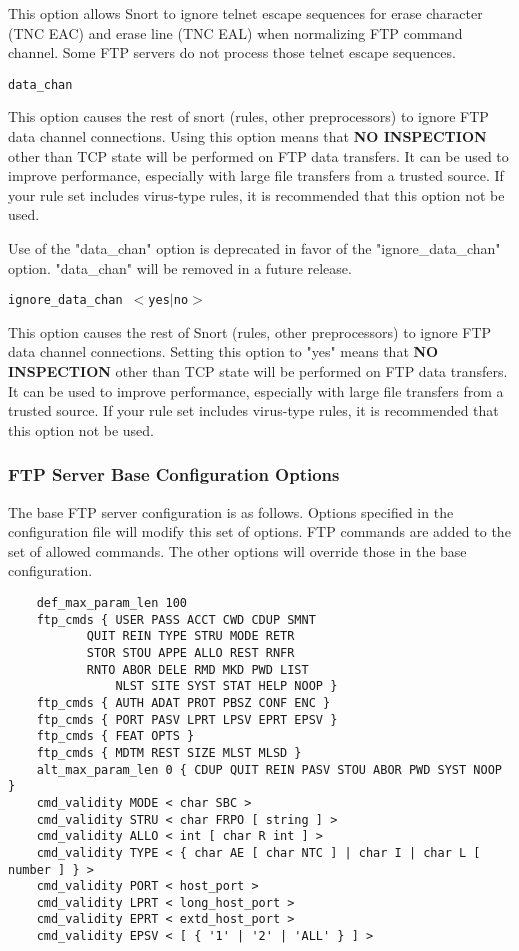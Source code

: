 \documentclass[english]{report}
\newcounter{slistnum}
\newenvironment{slist}
{ \begin{list}{ {\bf \arabic{slistnum}.} }{\usecounter{slistnum} } }
{ \end{list} }
\begin{document}
\begin{slist}
This option allows Snort to ignore telnet escape sequences for erase character
(TNC EAC) and erase line (TNC EAL) when normalizing FTP command channel.  Some FTP
servers do not process those telnet escape sequences.

\item \texttt{data\_chan}

This option causes the rest of snort (rules, other preprocessors) to ignore FTP
data channel connections.  Using this option means that \textbf{NO INSPECTION}
other than TCP state will be performed on FTP data transfers.  It can be used
to improve performance, especially with large file transfers from a trusted
source.   If your rule set includes virus-type rules, it is recommended that
this option not be used.

Use of the "data\_chan" option is deprecated in favor of the
"ignore\_data\_chan" option. "data\_chan" will be removed in a future release.

\item \texttt{ignore\_data\_chan $<$yes$|$no$>$}

This option causes the rest of Snort (rules, other preprocessors) to ignore FTP
data channel connections.  Setting this option to "yes" means that \textbf{NO
INSPECTION} other than TCP state will be performed on FTP data transfers.  It
can be used to improve performance, especially with large file transfers from a
trusted source.  If your rule set includes virus-type rules, it is recommended
that this option not be used.

\end{slist}

\subsubsection{FTP Server Base Configuration Options}
\label{sub:default ftp server config}

The base FTP server configuration is as follows.  Options specified in the
configuration file will modify this set of options.  FTP commands are added to
the set of allowed commands.  The other options will override those in the base
configuration.

\begin{verbatim}
    def_max_param_len 100
    ftp_cmds { USER PASS ACCT CWD CDUP SMNT 
	       QUIT REIN TYPE STRU MODE RETR 
	       STOR STOU APPE ALLO REST RNFR 
	       RNTO ABOR DELE RMD MKD PWD LIST 
               NLST SITE SYST STAT HELP NOOP } 
    ftp_cmds { AUTH ADAT PROT PBSZ CONF ENC } 
    ftp_cmds { PORT PASV LPRT LPSV EPRT EPSV } 
    ftp_cmds { FEAT OPTS } 
    ftp_cmds { MDTM REST SIZE MLST MLSD } 
    alt_max_param_len 0 { CDUP QUIT REIN PASV STOU ABOR PWD SYST NOOP } 
    cmd_validity MODE < char SBC > 
    cmd_validity STRU < char FRPO [ string ] > 
    cmd_validity ALLO < int [ char R int ] > 
    cmd_validity TYPE < { char AE [ char NTC ] | char I | char L [ number ] } > 
    cmd_validity PORT < host_port > 
    cmd_validity LPRT < long_host_port > 
    cmd_validity EPRT < extd_host_port > 
    cmd_validity EPSV < [ { '1' | '2' | 'ALL' } ] >
\end{verbatim}
\end{document}
